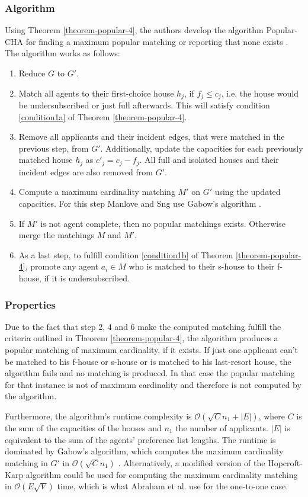 \subsubsection{Algorithm}
Using Theorem \ref{theorem-popular-4}, the authors develop the algorithm Popular-CHA for finding a maximum popular matching or reporting that none exists \cite{ManlovePopularMatchings}. The algorithm works as follows:
\begin{enumerate}
    \item Reduce $G$ to $G'$.
    \item Match all agents to their first-choice house $h_j$, if $f_j \leq c_j$, i.e. the house would be undersubscribed or just full afterwards. This will satisfy condition \ref{condition1a} of Theorem \ref{theorem-popular-4}.
    \item Remove all applicants and their incident edges, that were matched in the previous step, from $G'$. Additionally, update the capacities for each previously matched house $h_j$ as $c'_j = c_j - f_j$. All full and isolated houses and their incident edges are also removed from $G'$.
    \item Compute a maximum cardinality matching $M'$ on $G'$ using the updated capacities. For this step Manlove and Sng use Gabow's algorithm \cite{Gabow1983}.
    \item If $M'$ is not agent complete, then no popular matchings exists. Otherwise merge the matchings $M$ and $M'$.
    \item As a last step, to fulfill condition \ref{condition1b} of Theorem \ref{theorem-popular-4}, promote any agent $a_i \in M$ who is matched to their s-house to their f-house, if it is undersubscribed. 
\end{enumerate}


\subsubsection{Properties}
Due to the fact that step 2, 4 and 6 make the computed matching fulfill the criteria outlined in Theorem \ref{theorem-popular-4}, the algorithm produces a popular matching of maximum cardinality, if it exists. If just one applicant can't be matched to his f-house or s-house or is matched to his last-resort house, the algorithm fails and no matching is produced. In that case the popular matching for that instance is not of maximum cardinality and therefore is not computed by the algorithm. 

Furthermore, the algorithm's runtime complexity is $\mathcal{O}(\sqrt{C}n_1 + |E|)$, where $C$ is the sum of the capacities of the houses and $n_1$ the number of applicants. $|E|$ is equivalent to the sum of the agents' preference list lengths. The runtime is dominated by Gabow's algorithm, which computes the maximum cardinality matching in $G'$ in $\mathcal{O}(\sqrt{C}n_1)$ \cite{ManlovePopularMatchings}. Alternatively, a modified version of the Hopcroft-Karp algorithm could be used for computing the maximum cardinality matching in $\mathcal{O}(E\sqrt{V})$\cite{Hopcroft} time, which is what Abraham et al. use for the one-to-one case.

